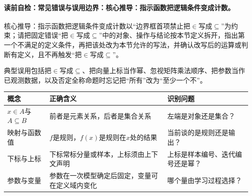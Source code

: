 \label{schema:V1-C01:CH-19}
\label{schema:V1-C01:CH-20}
\label{schema:V1-C01:CH-21}
\label{schema:V1-C01:CH-22}
\label{schema:V1-C01:CH-23}
\label{schema:V1-C01:CH-24}
\label{schema:V1-C01:CH-25}
\label{schema:V1-C01:CH-26}
\label{schema:V1-C01:CH-27}
\label{schema:V1-C01:CH-28}
\label{schema:V1-C01:CH-29}

\paragraph{读前自检：常见错误与误用边界：核心推导：指示函数把逻辑条件变成计数。}核心推导：指示函数把逻辑条件变成计数以“边界框首项禁止把$\in$写成$\subseteq$”为约束；请把固定错误“把$\in$写成$\subseteq$”中的对象、操作与结论按本节定义拆开，指出第一个不满足的定义条件，再把该处改为本节允许的写法，并确认改写后的运算或判断有定义，且不再触发“把$\in$写成$\subseteq$”。\par

\begin{warningbox}\label{schema:V1-C01:CH-30}
典型误用包括把$\in$写成$\subseteq$、把向量上标当作幂、忽视矩阵乘法顺序、把参数当作已观测数据，以及否定全称命题时忘记把“所有”改为“至少一个不”。
\end{warningbox}

\begin{comparisonbox}\label{schema:V1-C01:CH-31}
\begin{tabularx}{\linewidth}{@{}lXX@{}}
\toprule
概念 & 正确含义 & 识别问题\\
\midrule
$x\in A$与$A\subseteq B$ & 前者是元素关系，后者是集合关系 & 左端是对象还是集合？\\
映射与函数值 & $f$是规则，$f(x)$是规则在$x$处的结果 & 当前谈的是规则还是输出？\\
下标与上标 & 下标常标分量或样本，上标须由上下文声明 & 上标是样本编号、迭代编号还是幂？\\
参数与变量 & 参数在一次模型确定后固定，变量可在定义域内变化 & 哪个量由学习过程选择？\\
\bottomrule
\end{tabularx}
\end{comparisonbox}

